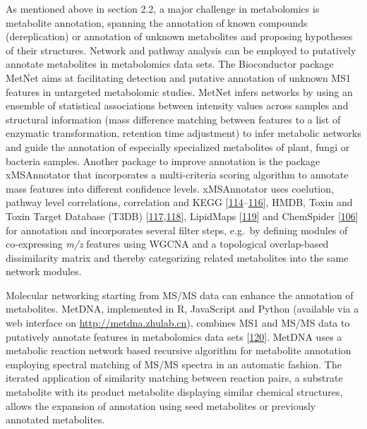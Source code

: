 \documentclass[]{article}
\begin{document}
As mentioned above in section 2.2, a major challenge in metabolomics is metabolite annotation, spanning the annotation of known compounds (dereplication) or annotation of unknown metabolites and proposing hypotheses of their structures. Network and pathway analysis can be employed to putatively annotate metabolites in metabolomics data sets. The Bioconductor package MetNet aims at facilitating detection and putative annotation of unknown MS1 features in untargeted metabolomic studies. MetNet infers networks by using an ensemble of statistical associations between intensity values across samples and structural information (mass difference matching between features to a list of enzymatic transformation, retention time adjustment) to infer metabolic networks and guide the annotation of especially specialized metabolites of plant, fungi or bacteria samples. Another package to improve annotation is the package xMSAnnotator that incorporates a multi-criteria scoring algorithm to annotate mass features into different confidence levels. xMSAnnotator uses coelution, pathway level correlations, correlation and KEGG {[}\protect\hyperlink{ref-kanehisa_2017}{114}--\protect\hyperlink{ref-kanehisa_2000}{116}{]}, HMDB, Toxin and Toxin Target Database (T3DB) {[}\protect\hyperlink{ref-lim_2010}{117},\protect\hyperlink{ref-wishart_2015}{118}{]}, LipidMaps {[}\protect\hyperlink{ref-fahy_2007}{119}{]} and ChemSpider {[}\protect\hyperlink{ref-pence_2010}{106}{]} for annotation and incorporates several filter steps, e.g.~by defining modules of co-expressing \emph{m/z} features using WGCNA and a topological overlap-based dissimilarity matrix and thereby categorizing related metabolites into the same network modules.

Molecular networking starting from MS/MS data can enhance the annotation of metabolites. MetDNA, implemented in R, JavaScript and Python (available via a web interface on \url{http://metdna.zhulab.cn}), combines MS1 and MS/MS data to putatively annotate features in metabolomics data sets {[}\protect\hyperlink{ref-shen_2019}{120}{]}. MetDNA uses a metabolic reaction network based recursive algorithm for metabolite annotation employing spectral matching of MS/MS spectra in an automatic fashion. The iterated application of similarity matching between reaction pairs, a substrate metabolite with its product metabolite displaying similar chemical structures, allows the expansion of annotation using seed metabolites or previously annotated metabolites.
\end{document}
